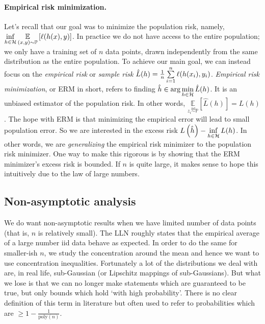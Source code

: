 \paragraph{Empirical risk minimization.} Let's recall that our goal was to minimize the population risk, namely, $\displaystyle\inf_{h\in{\mathcal{H}}}\underset{(x,y)\sim\mathbb P}{\mathbb E} \left[\ell(h(x),y)\right]$. In practice we do not have access to the entire
population; we only have a training set of $n$ data points, drawn independently from the same distribution as the entire population. To achieve our main goal, we can instead focus on the \textit{empirical risk} or \textit{sample risk} $\hat L(h) = \frac1n\sum\limits_{i=1}^{n}\ell(h(x_{i}),y_{i})$. \textit{Empirical risk minimization}, or ERM in short, refers to finding $\displaystyle\hat h \in \arg\min_{h\in{\mathcal{H}}} \hat L(h)$. It is an unbiased estimator of the population risk. In other words, $\underset{z_{i}\stackrel{\text{iid}}{\sim} \mathbb P}{\mathbb E} \left[\hat L(h)\right] = L(h)$. The hope with ERM is that minimizing the empirical error will lead to small population error. So we are interested in the excess risk $\displaystyle L\left(\hat h\right) - \inf_{h\in {\mathcal{H}}}L(h)$. In other words, we are \textit{generalizing} the empirical risk minimizer to the population risk minimizer. One way to make this rigorous is by showing that the ERM minimizer’s excess risk is bounded. If $n$ is quite large, it makes sense to hope this intuitively due to the law of large numbers. 


\subsection{Non-asymptotic analysis} 

We do want non-asymptotic results when we have limited number of data points (that is, $n$ is relatively small). The LLN roughly states that the empirical average of a large number iid data behave as expected. In order to do the same for smaller-ish $n$, we study the concentration around the mean and hence we want to use concentration inequalities. Fortunately a lot of the distributions we deal with are, in real life, sub-Gaussian (or Lipschitz mappings of sub-Gaussians). But what we lose is that we can no longer make statements which are guaranteed to be true, but only bounds which hold `with high probability'. There is no clear definition of this term in literature but often used to refer to probabilities which are $\ge 1-\frac{1}{\text{poly}(n)}$.


